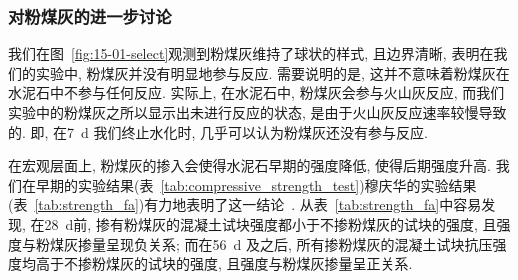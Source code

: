 \subsubsection{对粉煤灰的进一步讨论}\label{sec:fa_supp}

我们在图~\ref{fig:15-01-select}观测到粉煤灰维持了球状的样式, 且边界清晰, 表明在我们的实验中, 粉煤灰并没有明显地参与反应. 需要说明的是, 这并不意味着粉煤灰在水泥石中不参与任何反应. 实际上, 在水泥石中, 粉煤灰会参与火山灰反应, 而我们实验中的粉煤灰之所以显示出未进行反应的状态, 是由于火山灰反应速率较慢导致的. 即, 在\SI{7}{\day} 我们终止水化时, 几乎可以认为粉煤灰还没有参与反应.

在宏观层面上, 粉煤灰的掺入会使得水泥石早期的强度降低, 使得后期强度升高. 我们在早期的实验结果(表~\ref{tab:compressive_strength_test})穆庆华的实验结果(表~\ref{tab:strength_fa})有力地表明了这一结论~\cite{mu_fa}. 从表~\ref{tab:strength_fa}中容易发现, 在\SI{28}{\day}前, 掺有粉煤灰的混凝土试块强度都小于不掺粉煤灰的试块的强度, 且强度与粉煤灰掺量呈现负关系; 而在\SI{56}{\day} 及之后, 所有掺粉煤灰的混凝土试块抗压强度均高于不掺粉煤灰的试块的强度, 且强度与粉煤灰掺量呈正关系.

